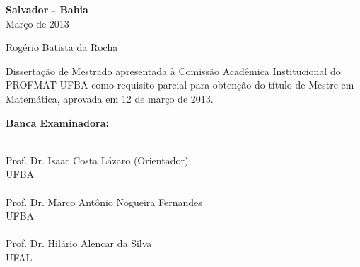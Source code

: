 \documentclass[12pt, a4paper]{report}
\begin{document}
\vspace{8cm}


\begin{center}
\textbf{Salvador - Bahia} \\
Março de 2013
\end{center}


\newpage
\begin{center}

\vspace{2.2cm}

\large{Rogério Batista da Rocha}
\end{center}

\vspace{2.2cm}

\begin{flushright}
\begin{minipage}{8.6cm} 
Dissertação de Mestrado apresentada à \mbox{Comissão}
Acadêmica Institucional do PROFMAT-UFBA como requisito
parcial para obtenção do título de Mestre em
Matemática, aprovada em 12 de março de 2013.
\end{minipage}
\end{flushright}
 
\vspace{1cm}
\begin{center}
\Large \textbf{Banca Examinadora:}
\end{center}
\vspace{1.5cm}

\begin{flushright}
\begin{minipage}[l]{12cm}
\begin{center}
\uline{\hspace{10.5cm}} \\
Prof. Dr. Isaac Costa Lázaro (Orientador) \\ UFBA \\
\vspace{1cm}
\uline{\hspace{10.5cm}} \\
Prof. Dr. Marco Antônio Nogueira Fernandes \\ UFBA \\
\vspace{1cm}
\uline{\hspace{10.5cm}} \\
Prof. Dr. Hilário Alencar da Silva \\ UFAL

\end{center}
\end{minipage}
\end{flushright}
\end{document}
